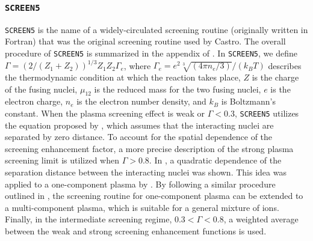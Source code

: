 \documentclass[preprint,times,tighten,linenumbers]{aastex631}
\newcommand{\castro}{{\sf Castro}}
\begin{document}


\subsubsection{{\tt SCREEN5}}

{\tt SCREEN5} is the name of a widely-circulated screening routine (originally written in Fortran) that was the original screening routine used by \castro.
The overall procedure of {\tt SCREEN5} is summarized in the appendix of \cite{Wallace:1982}. In {\tt SCREEN5}, we define $\Gamma = (2/(Z_1+Z_2))^{1/3}Z_1 Z_2 \Gamma_e$, where $\Gamma_e = e^2\sqrt[3]{(4\pi n_e/3)}/(k_BT)$ describes the thermodynamic condition at which the reaction takes place, $Z$ is the charge of the fusing nuclei, $\mu_{12}$ is the reduced mass for the two fusing nuclei, $e$ is the electron charge, $n_e$ is the electron number density, and $k_B$ is Boltzmann's constant. When the plasma screening effect is weak or $\Gamma < 0.3$, {\tt SCREEN5} utilizes the equation proposed by \cite{Graboske_1973, Dewitt_1973}, which assumes that the interacting nuclei are separated by zero distance. To account for the spatial dependence of the screening enhancement factor, a more precise description of the strong plasma screening limit is utilized when $\Gamma > 0.8$. In \cite{jancovici:1977}, a quadratic dependence of the separation distance between the interacting nuclei was shown. This idea was applied to a one-component plasma by \cite{alastuey:1978}. By following a similar procedure outlined in \cite{itoh:1979}, the screening routine for one-component plasma can be extended to a multi-component plasma, which is suitable for a general mixture of ions. Finally, in
the intermediate screening regime, $0.3 < \Gamma < 0.8$, a weighted average between the weak and strong screening enhancement functions is used.





\end{document}
